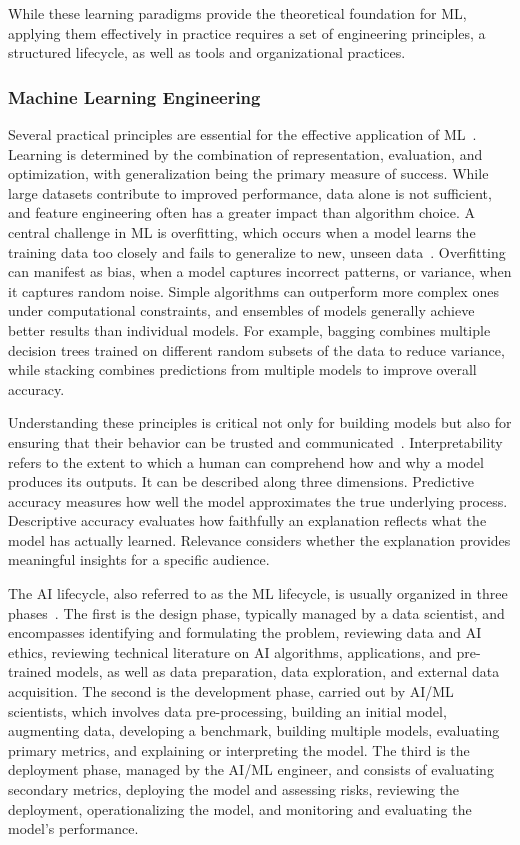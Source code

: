 \documentclass[
english,                 %
bibtex,                  %
includeExtraAbstracts, %
]{kththesis}
\numberwithin{listing}{chapter}
\begin{document}
While these learning paradigms provide the theoretical foundation for \gls{ML}, applying them effectively in practice requires a set of engineering principles, a structured lifecycle, as well as tools and organizational practices.

\subsubsection{Machine Learning Engineering}

Several practical principles are essential for the effective application of \gls{ML}~\cite{domingos_few_2012}. Learning is determined by the combination of representation, evaluation, and optimization, with generalization being the primary measure of success. While large datasets contribute to improved performance, data alone is not sufficient, and feature engineering often has a greater impact than algorithm choice. A central challenge in \gls{ML} is overfitting, which occurs when a model learns the training data too closely and fails to generalize to new, unseen data~\cite{chen_xgboost_2016}. Overfitting can manifest as bias, when a model captures incorrect patterns, or variance, when it captures random noise. Simple algorithms can outperform more complex ones under computational constraints, and ensembles of models generally achieve better results than individual models. For example, bagging combines multiple decision trees trained on different random subsets of the data to reduce variance, while stacking combines predictions from multiple models to improve overall accuracy.

Understanding these principles is critical not only for building models but also for ensuring that their behavior can be trusted and communicated~\cite{murdoch_definitions_2019}. Interpretability refers to the extent to which a human can comprehend how and why a model produces its outputs. It can be described along three dimensions. Predictive accuracy measures how well the model approximates the true underlying process. Descriptive accuracy evaluates how faithfully an explanation reflects what the model has actually learned. Relevance considers whether the explanation provides meaningful insights for a specific audience.

The \gls{AI} lifecycle, also referred to as the \gls{ML} lifecycle, is usually organized in three phases~\cite{de_silva_artificial_2022}. The first is the design phase, typically managed by a data scientist, and encompasses identifying and formulating the problem, reviewing data and \gls{AI} ethics, reviewing technical literature on \gls{AI} algorithms, applications, and pre-trained models, as well as data preparation, data exploration, and external data acquisition. The second is the development phase, carried out by \gls{AI}/\gls{ML} scientists, which involves data pre-processing, building an initial model, augmenting data, developing a benchmark, building multiple models, evaluating primary metrics, and explaining or interpreting the model. The third is the deployment phase, managed by the \gls{AI}/\gls{ML} engineer, and consists of evaluating secondary metrics, deploying the model and assessing risks, reviewing the deployment, operationalizing the model, and monitoring and evaluating the model's performance.
\end{document}
